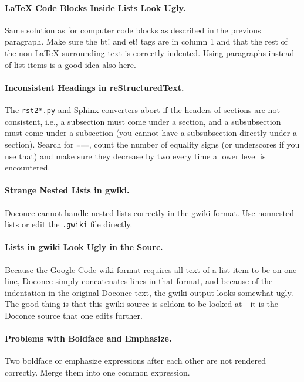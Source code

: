 \documentclass{article}
\begin{document}
\paragraph{LaTeX Code Blocks Inside Lists Look Ugly.}
Same solution as for computer code blocks as described in the
previous paragraph. Make sure the {\fontsize{10pt}{10pt}\verb!!bt!} and {\fontsize{10pt}{10pt}\verb!!et!} tags are in column 1
and that the rest of the non-{\LaTeX} surrounding text is correctly indented.
Using paragraphs instead of list items is a good idea also here.

\paragraph{Inconsistent Headings in reStructuredText.}
The {\fontsize{10pt}{10pt}\verb!rst2*.py!} and Sphinx converters abort if the headers of sections
are not consistent, i.e., a subsection must come under a section,
and a subsubsection must come under a subsection (you cannot have
a subsubsection directly under a section). Search for {\fontsize{10pt}{10pt}\verb!===!},
count the number of equality signs (or underscores if you use that)
and make sure they decrease by two every time a lower level is encountered.

\paragraph{Strange Nested Lists in gwiki.}
Doconce cannot handle nested lists correctly in the gwiki format.
Use nonnested lists or edit the {\fontsize{10pt}{10pt}\verb!.gwiki!} file directly.

\paragraph{Lists in gwiki Look Ugly in the Sourc.}
Because the Google Code wiki format requires all text of a list item to
be on one line, Doconce simply concatenates lines in that format,
and because of the indentation in the original Doconce text, the gwiki
output looks somewhat ugly. The good thing is that this gwiki source
is seldom to be looked at - it is the Doconce source that one edits
further.

\paragraph{Problems with Boldface and Emphasize.}
Two boldface or emphasize expressions after each other are not rendered
correctly. Merge them into one common expression.
\end{document}
